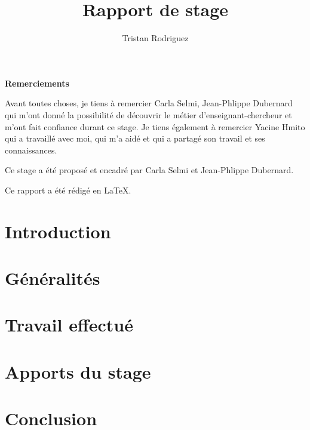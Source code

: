\documentclass{univ-projet}
\author{Tristan Rodriguez}
\title{Rapport de stage}
\begin{document}
  \maketitle
    \begin{center}
      \textbf{Remerciements}

      Avant toutes choses, je tiens à remercier Carla Selmi, Jean-Phlippe Dubernard qui m'ont donné la possibilité de découvrir le métier d'enseignant-chercheur et m'ont fait confiance durant ce stage. Je tiens également à remercier Yacine Hmito qui a travaillé avec moi, qui m'a aidé et qui a partagé son travail et ses connaissances.

      Ce stage a été proposé et encadré par Carla Selmi et Jean-Phlippe Dubernard.

      Ce rapport a été rédigé en \LaTeX.
    \end{center}

  \clearpage
  
  \tableofcontents
  \clearpage

  \section{Introduction}
  \label{sec:Introduction}
  
  
  \section{Généralités}
  \label{sec:Généralités}
  
    
  \section{Travail effectué}
  \label{sec:Travail effectué}
  

  \section{Apports du stage}
  \label{Apports du stage}
  
  
  \section{Conclusion}
  \label{sec:Conclusion}
  
  \clearpage

  \nocite{*}
  
  
  
\end{document}
